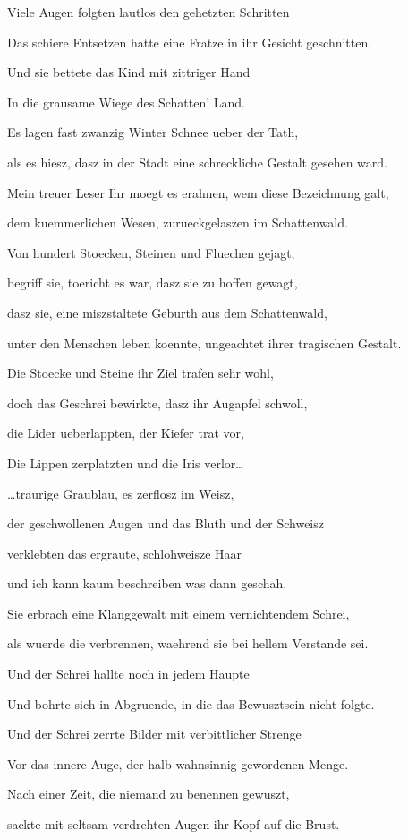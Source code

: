 \documentclass[a5paper,8pt]{book}
\begin{document}
Viele Augen folgten lautlos den gehetzten Schritten

Das schiere Entsetzen hatte eine Fratze in ihr Gesicht geschnitten.

Und sie bettete das Kind mit zittriger Hand

In die grausame Wiege des Schatten’ Land.

Es lagen fast zwanzig Winter Schnee ueber der Tath, 

als es hiesz, dasz in der Stadt eine schreckliche Gestalt gesehen ward.

Mein treuer Leser Ihr moegt es erahnen, wem diese Bezeichnung galt, 

dem kuemmerlichen Wesen, zurueckgelaszen im Schattenwald.

Von hundert Stoecken, Steinen und Fluechen gejagt,

begriff sie, toericht es war, dasz sie zu hoffen gewagt, 

dasz sie, eine miszstaltete Geburth aus dem Schattenwald,

unter den Menschen leben koennte, ungeachtet ihrer tragischen Gestalt.

Die Stoecke und Steine ihr Ziel trafen sehr wohl, 

doch das Geschrei bewirkte, dasz ihr Augapfel schwoll, 

die Lider ueberlappten, der Kiefer trat vor,

Die Lippen zerplatzten und die Iris verlor…

…traurige Graublau, es zerflosz im Weisz,

der geschwollenen Augen und das Bluth und der Schweisz

verklebten das ergraute, schlohweisze Haar

und ich kann kaum beschreiben was dann geschah.

Sie erbrach eine Klanggewalt mit einem vernichtendem Schrei,

als wuerde die verbrennen, waehrend sie bei hellem Verstande sei.

Und der Schrei hallte noch in jedem Haupte

Und bohrte sich in Abgruende, in die das Bewusztsein nicht folgte.

Und der Schrei zerrte Bilder mit verbittlicher Strenge 

Vor das innere Auge, der halb wahnsinnig gewordenen Menge. 

Nach einer Zeit, die niemand zu benennen gewuszt,

sackte mit seltsam verdrehten Augen ihr Kopf auf die Brust.
\end{document}

